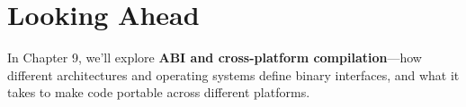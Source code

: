 \section{Looking Ahead}

In Chapter 9, we'll explore \textbf{ABI and cross-platform compilation}—how different architectures and operating systems define binary interfaces, and what it takes to make code portable across different platforms.
